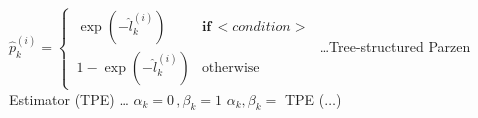\documentclass[review,1p,times,numbers]{elsarticle}
\newenvironment{SgAlgorithm}[1][t]
{%
	\begin{algorithm2e}[#1]
    \linespread{1.2}
    \selectfont
}
{\end{algorithm2e}}
\begin{document}
\begin{SgAlgorithm}
{{            $\widehat{p}_k^{(i)} =
                \begin{cases}
                    \, \exp(-\widehat{l}_k^{(i)})  & \textbf{if} \, <condition>
                    \\
                    \, 1 - \exp(-\widehat{l}_k^{(i)}) & \text{otherwise}
                \end{cases}$
        }
    }
    \BlankLine%
    {%
        \dots Tree-structured Parzen Estimator (TPE) \dots \;
    }
    \Fn{}
    {
        {%
            $ \alpha_k = 0 \, , \beta_k = 1$ \;
            {%
                $ \alpha_k, \beta_k =$ TPE ($\dots$)
            }
        }
    }
    \BlankLine%
\end{SgAlgorithm}
\end{document}
